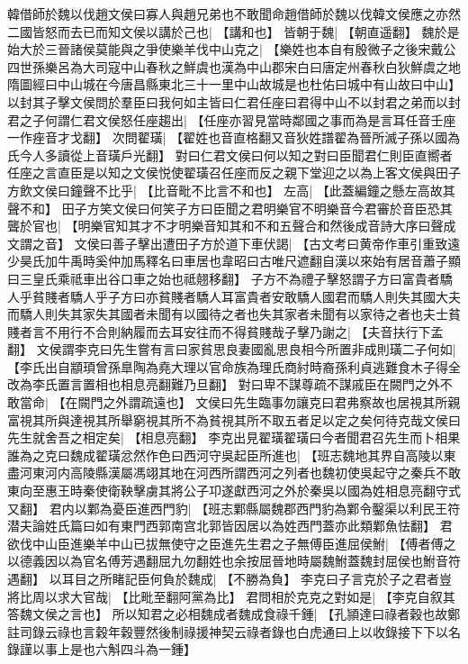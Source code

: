 韓借師於魏以伐趙文侯曰寡人與趙兄弟也不敢聞命趙借師於魏以伐韓文侯應之亦然二國皆怒而去已而知文侯以講於己也|{
	【講和也】}
皆朝于魏|{
	【朝直遥翻】}
魏於是始大於三晉諸侯莫能與之爭使樂羊伐中山克之|{
	【樂姓也本自有殷微子之後宋戴公四世孫樂呂為大司寇中山春秋之鮮虞也漢為中山郡宋白曰唐定州春秋白狄鮮虞之地隋圖經曰中山城在今唐昌縣東北三十一里中山故城是也杜佑曰城中有山故曰中山】}
以封其子擊文侯問於羣臣曰我何如主皆曰仁君任座曰君得中山不以封君之弟而以封君之子何謂仁君文侯怒任座趨出|{
	【任座亦習見當時鄰國之事而為是言耳任音壬座一作痤音才戈翻】}
次問翟璜|{
	【翟姓也音直格翻又音狄姓譜翟為晉所滅子孫以國為氏今人多讀從上音璜戶光翻】}
對曰仁君文侯曰何以知之對曰臣聞君仁則臣直嚮者任座之言直臣是以知之文侯悦使翟璜召任座而反之親下堂迎之以為上客文侯與田子方飲文侯曰鐘聲不比乎|{
	【比音毗不比言不和也】}
左高|{
	【此蓋編鐘之懸左高故其聲不和】}
田子方笑文侯曰何笑子方曰臣聞之君明樂官不明樂音今君審於音臣恐其聾於官也|{
	【明樂官知其才不才明樂音知其和不和五聲合和然後成音詩大序曰聲成文謂之音】}
文侯曰善子擊出遭田子方於道下車伏謁|{
	【古文考曰黄帝作車引重致遠少昊氏加牛禹時奚仲加馬釋名曰車居也韋昭曰古唯尺遮翻自漢以來始有居音蕭子顯曰三皇氏乘祗車出谷口車之始也祗翹移翻】}
子方不為禮子擊怒謂子方曰富貴者驕人乎貧賤者驕人乎子方曰亦貧賤者驕人耳富貴者安敢驕人國君而驕人則失其國大夫而驕人則失其家失其國者未聞有以國待之者也失其家者未聞有以家待之者也夫士貧賤者言不用行不合則納履而去耳安往而不得貧賤哉子擊乃謝之|{
	【夫音扶行下孟翻】}
文侯謂李克曰先生嘗有言曰家貧思良妻國亂思良相今所置非成則璜二子何如|{
	【李氏出自顓頊曾孫臯陶為堯大理以官命族為理氏商紂時裔孫利貞逃難食木子得全改為李氏置言置相也相息亮翻難乃旦翻】}
對曰卑不謀尊疏不謀戚臣在闕門之外不敢當命|{
	【在闕門之外謂疏遠也】}
文侯曰先生臨事勿讓克曰君弗察故也居視其所親富視其所與達視其所舉窮視其所不為貧視其所不取五者足以定之矣何待克哉文侯曰先生就舍吾之相定矣|{
	【相息亮翻】}
李克出見翟璜翟璜曰今者聞君召先生而卜相果誰為之克曰魏成翟璜忿然作色曰西河守吳起臣所進也|{
	【班志魏地其界自高陵以東盡河東河内高陵縣漢屬馮翊其地在河西所謂西河之列者也魏初使吳起守之秦兵不敢東向至惠王時秦使衛鞅擊虜其將公子卭遂獻西河之外於秦吳以國為姓相息亮翻守式又翻】}
君内以鄴為憂臣進西門豹|{
	【班志鄴縣屬魏郡西門豹為鄴令鑿渠以利民王符潜夫論姓氏篇曰如有東門西郭南宫北郭皆因居以為姓西門蓋亦此類鄴魚怯翻】}
君欲伐中山臣進樂羊中山已拔無使守之臣進先生君之子無傅臣進屈侯鮒|{
	【傅者傅之以德義因以為官名傅芳遇翻屈九勿翻姓也余按屈晉地時屬魏鮒蓋魏封屈侯也鮒音符遇翻】}
以耳目之所睹記臣何負於魏成|{
	【不勝為負】}
李克曰子言克於子之君者豈將比周以求大官哉|{
	【比毗至翻阿黨為比】}
君問相於克克之對如是|{
	【李克自叙其答魏文侯之言也】}
所以知君之必相魏成者魏成食祿千鍾|{
	【孔頴達曰祿者穀也故鄭註司錄云祿也言穀年穀豐然後制祿援神契云祿者錄也白虎通曰上以收錄接下下以名錄謹以事上是也六斛四斗為一鍾】}
